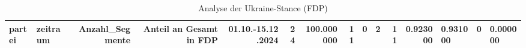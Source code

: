\begin{table}
\caption{Analyse der Ukraine-Stance (FDP)}
\label{tab:meine_tabelle}
\begin{tabular}{llrrrrrrrrrr}
\toprule
partei & zeitraum & Anzahl_Segmente & Anteil an Gesamt in %
\midrule
FDP & 01.10.-15.12.2024 & 24 & 100.000000 & 11 & 0 & 2 & 11 & 0.923000 & 0.931000 & 0 & 0.000000 \\
\bottomrule
\end{tabular}
\end{table}
